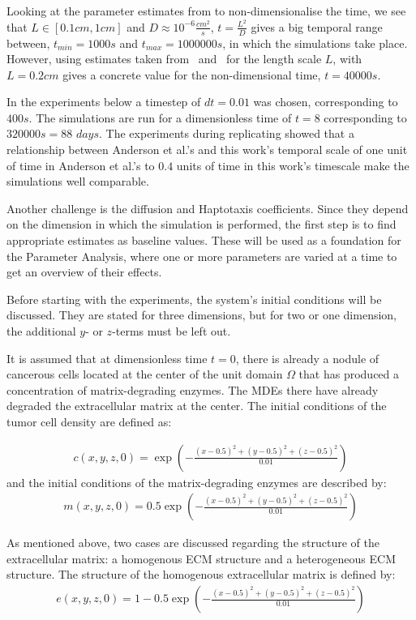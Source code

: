 Looking at the parameter estimates from \cite{anderson_mathematical_2000} to non-dimensionalise the time, we see that $L \in [0.1cm,1cm]$ and $D\approx 10^{-6}\frac{cm^2}{s}$, $t = \frac{L^2}{D}$ gives a big temporal range between, $t_{min} = 1000s$ and $t_{max} = 1000000s$, in which the simulations take place. However, using estimates taken from~\cite{STEPHANOU200696} and~\cite{franssen_mathematical_2019} for the length scale $L$, with $L=0.2cm$ gives a concrete value for the non-dimensional time, $t=40000s$.

In the experiments below a timestep of $dt=0.01$ was chosen, corresponding to $400s$. The simulations are run for a dimensionless time of $t=8$ corresponding to $320000s=88$ $days$. The experiments during replicating  showed that a relationship between Anderson et al.'s and this work's temporal scale of one unit of time in Anderson et al.'s to $0.4$ units of time in this work's timescale make the simulations well comparable.

Another challenge is the diffusion and Haptotaxis coefficients. Since they depend on the dimension in which the simulation is performed, the first step is to find appropriate estimates as baseline values. These will be used as a foundation for the Parameter Analysis, where one or more parameters are varied at a time to get an overview of their effects. 

Before starting with the experiments, the system's initial conditions will be discussed. They are stated for three dimensions, but for two or one dimension, the additional $y$- or $z$-terms must be left out.

It is assumed that at dimensionless time $t=0$, there is already a nodule of cancerous cells located at the center of the unit domain $\Omega$ that has produced a concentration of matrix-degrading enzymes. The MDEs there have already degraded the extracellular matrix at the center. The initial conditions of the tumor cell density are defined as:

\begin{align*}
    c(x,y,z,0)= \exp(-\frac{(x-0.5)^2+(y-0.5)^2+(z-0.5)^2}{0.01})
\end{align*}
and the initial conditions of the matrix-degrading enzymes are described by:
\begin{align*}
    m(x,y,z,0) = 0.5 \exp(-\frac{(x-0.5)^2+(y-0.5)^2+(z-0.5)^2}{0.01})
\end{align*}

As mentioned above, two cases are discussed regarding the structure of the extracellular matrix: a homogenous ECM structure and a heterogeneous ECM structure.
The structure of the homogenous extracellular matrix is defined by:
\begin{align*}
    e(x,y,z,0) = 1 - 0.5 \exp(-\frac{(x-0.5)^2+(y-0.5)^2+(z-0.5)^2}{0.01})
\end{align*}

